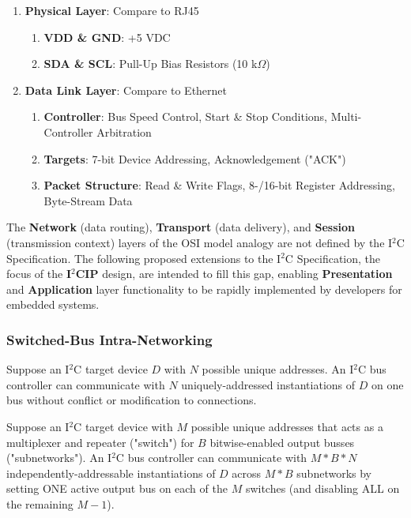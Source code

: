 \documentclass{../tex/report}
\begin{document}
\begin{enumerate}[label=SC\arabic*., ref=SC\arabic*]
    \item\label{sc:1} \textbf{Physical Layer}: Compare to RJ45
    \begin{enumerate}[ref=SC1\alph*]
        \item\label{sc:1a} \textbf{VDD \& GND}: +5 VDC
        \item\label{sc:1b} \textbf{SDA \& SCL}: Pull-Up Bias Resistors (10 k$\Omega$)
    \end{enumerate}
    \item\label{sc:2} \textbf{Data Link Layer}: Compare to Ethernet
    \begin{enumerate}[ref=SC2\alph*]
        \item\label{sc:2a} \textbf{Controller}: Bus Speed Control, Start \& Stop Conditions, Multi-Controller Arbitration
        \item\label{sc:2b} \textbf{Targets}: 7-bit Device Addressing, Acknowledgement ("ACK")
        \item\label{sc:2c} \textbf{Packet Structure}: Read \& Write Flags, 8-/16-bit Register Addressing, Byte-Stream Data
    \end{enumerate}
\end{enumerate}

\hspace{24pt} The \textbf{Network} (data routing), \textbf{Transport} (data delivery), and \textbf{Session} (transmission context) layers of the OSI model analogy are not defined by the I${}^2$C Specification. The following proposed extensions to the I${}^2$C Specification, the focus of the \textbf{I${}^2$CIP} design, are intended to fill this gap, enabling \textbf{Presentation} and \textbf{Application} layer functionality to be rapidly implemented by developers for embedded systems.


\subsubsection{Switched-Bus Intra-Networking}

\hspace{24pt} Suppose an I${}^2$C target device $D$ with $N$ possible unique addresses. An I${}^2$C bus controller can communicate with $N$ uniquely-addressed instantiations of $D$ on one bus without conflict or modification to connections.

\hspace{24pt} Suppose an I${}^2$C target device with $M$ possible unique addresses that acts as a multiplexer and repeater ("switch") for $B$ bitwise-enabled output busses ("subnetworks"). An I${}^2$C bus controller can communicate with $M * B * N$ independently-addressable instantiations of $D$ across $M * B$ subnetworks by setting ONE active output bus on each of the $M$ switches (and disabling ALL on the remaining $M - 1$).
\end{document}
